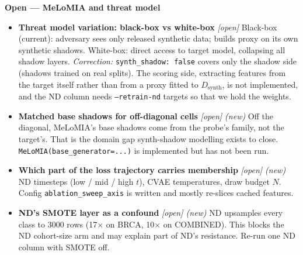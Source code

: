 \noindent\textbf{Open --- MeLoMIA and threat model}
\begin{itemize}
\item \textbf{Threat model variation: black-box vs white-box} \emph{[open]} Black-box (current): adversary sees only released synthetic data; builds proxy on its own synthetic shadows. White-box: direct access to target model, collapsing all shadow layers. \emph{Correction:} \texttt{synth\_shadow: false} covers only the shadow side (shadows trained on real splits). The scoring side, extracting features from the target itself rather than from a proxy fitted to $D_\text{synth}$, is not implemented, and the ND column needs \texttt{--retrain-nd} targets so that we hold the weights.
\item \textbf{Matched base shadows for off-diagonal cells} \emph{[open] (new)} Off the diagonal, MeLoMIA's base shadows come from the probe's family, not the target's. That is the domain gap synth-shadow modelling exists to close. \texttt{MeLoMIA(base\_generator=...)} is implemented but has not been run.
\item \textbf{Which part of the loss trajectory carries membership} \emph{[open] (new)} ND timesteps (low / mid / high $t$), CVAE temperatures, draw budget $N$. Config \texttt{ablation\_sweep\_axis} is written and mostly re-slices cached features.
\item \textbf{ND's SMOTE layer as a confound} \emph{[open] (new)} ND upsamples every class to 3000 rows (17$\times$ on BRCA, 10$\times$ on COMBINED). This blocks the ND cohort-size arm and may explain part of ND's resistance. Re-run one ND column with SMOTE off.
\end{itemize}

